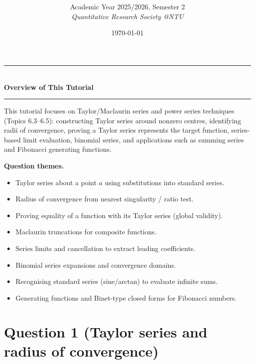 \documentclass[12pt]{article}
\title{
\CourseCode\ \CourseName \\[0.3em]
\large \DocType
}
\author{
  Academic Year 2025/2026, Semester 2 \\[0.25em]
  \textit{Quantitative Research Society @NTU}
}
\date{\today}
\begin{document}
\maketitle
\thispagestyle{plainfirst}
\pagestyle{main}
\bigskip

\begin{center}
  \rule{0.8\textwidth}{0.4pt}\\[4pt]
  \textbf{Overview of This Tutorial}\\[2pt]
  \rule{0.8\textwidth}{0.4pt}
\end{center}

\noindent
This tutorial focuses on Taylor/Maclaurin series and power series techniques (Topics 6.3--6.5): constructing Taylor series around nonzero centres, identifying radii of convergence, proving a Taylor series represents the target function, series-based limit evaluation, binomial series, and applications such as summing series and Fibonacci generating functions.

\noindent
\textbf{Question themes.}
\begin{itemize}[leftmargin=*]
  \item Taylor series about a point \(a\) using substitutions into standard series.
  \item Radius of convergence from nearest singularity / ratio test.
  \item Proving equality of a function with its Taylor series (global validity).
  \item Maclaurin truncations for composite functions.
  \item Series limits and cancellation to extract leading coefficients.
  \item Binomial series expansions and convergence domains.
  \item Recognising standard series (sine/arctan) to evaluate infinite sums.
  \item Generating functions and Binet-type closed forms for Fibonacci numbers.
\end{itemize}

\bigskip


\newpage
\tableofcontents


\newpage
\section{Question 1 (Taylor series and radius of convergence)}
\end{document}
